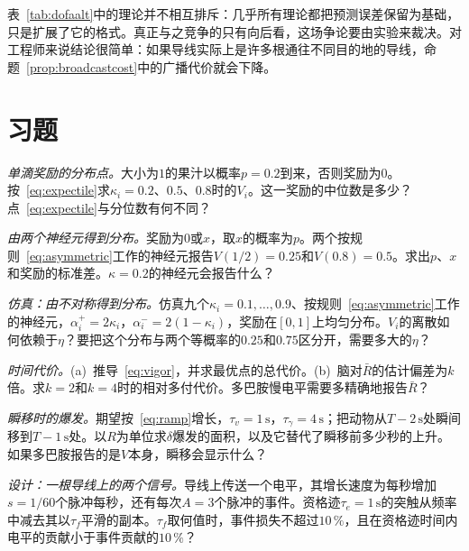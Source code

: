 表~\ref{tab:dofaalt}中的理论并不相互排斥：几乎所有理论都把预测误差保留为基础，只是扩展了它的格式。真正与之竞争的只有向后看，这场争论要由实验来裁决。对工程师来说结论很简单：如果导线实际上是许多根通往不同目的地的导线，命题~\ref{prop:broadcastcost}中的广播代价就会下降。

\section{习题}

\begin{exercise}[\lvlA]
\label{ex:07:1}
\emph{单滴奖励的分布点。}大小为$1$的果汁以概率$p=0.2$到来，否则奖励为$0$。按~\eqref{eq:expectile}求$\kappa_i=0.2$、$0.5$、$0.8$时的$V_i$。这一奖励的中位数是多少？点~\eqref{eq:expectile}与分位数有何不同？
\end{exercise}

\begin{exercise}[\lvlB]
\label{ex:07:2}
\emph{由两个神经元得到分布。}奖励为$0$或$x$，取$x$的概率为$p$。两个按规则~\eqref{eq:asymmetric}工作的神经元报告$V(1/2)=0.25$和$V(0.8)=0.5$。求出$p$、$x$和奖励的标准差。$\kappa=0.2$的神经元会报告什么？
\end{exercise}

\begin{exercise}[\lvlB]
\label{ex:07:3}
\emph{仿真：由不对称得到分布。}仿真九个$\kappa_i=0.1,\dots,0.9$、按规则~\eqref{eq:asymmetric}工作的神经元，$\alpha_i^+=2\kappa_i$，$\alpha_i^-=2(1-\kappa_i)$，奖励在$[0,1]$上均匀分布。$V_i$的离散如何依赖于$\eta$？要把这个分布与两个等概率的$0.25$和$0.75$区分开，需要多大的$\eta$？
\end{exercise}

\begin{exercise}[\lvlA]
\label{ex:07:4}
\emph{时间代价。}(a)~推导~\eqref{eq:vigor}，并求最优点的总代价。(b)~脑对$\bar R$的估计偏差为$k$倍。求$k=2$和$k=4$时的相对多付代价。多巴胺慢电平需要多精确地报告$\bar R$？
\end{exercise}

\begin{exercise}[\lvlB]
\label{ex:07:5}
\emph{瞬移时的爆发。}期望按~\eqref{eq:ramp}增长，$\tau_v=1\,\text{s}$，$\tau_\gamma=4\,\text{s}$；把动物从$T-2\,\text{s}$处瞬间移到$T-1\,\text{s}$处。以$R$为单位求$\delta$爆发的面积，以及它替代了瞬移前多少秒的上升。如果多巴胺报告的是$V$本身，瞬移会显示什么？
\end{exercise}

\begin{exercise}[\lvlB]
\label{ex:07:6}
\emph{设计：一根导线上的两个信号。}导线上传送一个电平，其增长速度为每秒增加$s=1/60$个脉冲每秒，还有每次$A=3$个脉冲的事件。资格迹$\tau_e=1\,\text{s}$的突触从频率中减去其以$\tau_f$平滑的副本。$\tau_f$取何值时，事件损失不超过$10\,\%$，且在资格迹时间内电平的贡献小于事件贡献的$10\,\%$？
\end{exercise}

